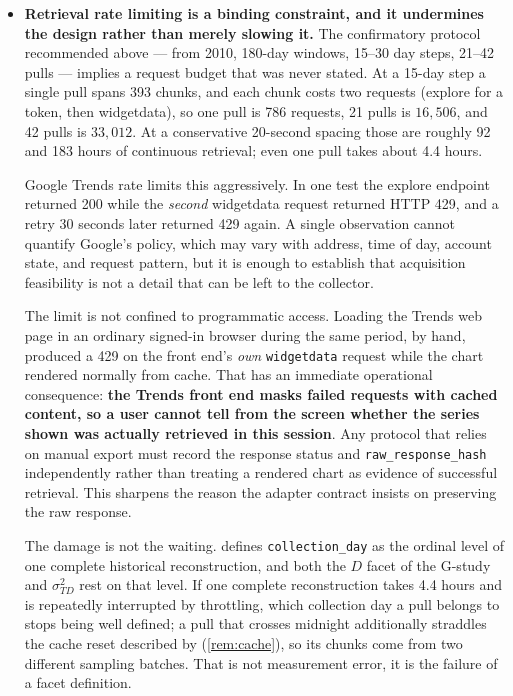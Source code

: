 \documentclass[12pt,a4paper,oneside]{article}
\begin{document}
\begin{itemize}
scraper, because endpoints, rate limits, authentication, and terms of service
change. Collectors need only emit the documented long-format schema.
\item \textbf{Retrieval rate limiting is a binding constraint, and it undermines
the design rather than merely slowing it.} The confirmatory protocol recommended
above --- from 2010, 180-day windows, 15--30 day steps, 21--42 pulls --- implies a
request budget that was never stated. At a 15-day step a single pull spans 393
chunks, and each chunk costs two requests (explore for a token, then
widgetdata), so one pull is 786 requests, 21 pulls is $16{,}506$, and 42 pulls is
$33{,}012$. At a conservative 20-second spacing those are roughly 92 and 183
hours of continuous retrieval; even one pull takes about 4.4 hours.

Google Trends rate limits this aggressively. In one test the explore endpoint
returned 200 while the \emph{second} widgetdata request returned HTTP 429, and a
retry 30 seconds later returned 429 again. A single observation cannot quantify
Google's policy, which may vary with address, time of day, account state, and
request pattern, but it is enough to establish that acquisition feasibility is
not a detail that can be left to the collector.

The limit is not confined to programmatic access. Loading the Trends web page in
an ordinary signed-in browser during the same period, by hand, produced a 429 on
the front end's \emph{own} \texttt{widgetdata} request while the chart rendered
normally from cache. That has an immediate operational consequence:
\textbf{the Trends front end masks failed requests with cached content, so a user
cannot tell from the screen whether the series shown was actually retrieved in
this session}. Any protocol that relies on manual export must record the response
status and \texttt{raw\_response\_hash} independently rather than treating a
rendered chart as evidence of successful retrieval. This sharpens the reason the
adapter contract insists on preserving the raw response.

The damage is not the waiting.  defines \texttt{collection\_day}
as the ordinal level of one complete historical reconstruction, and both the $D$
facet of the G-study and $\sigma^2_{TD}$ rest on that level. If one complete
reconstruction takes 4.4 hours and is repeatedly interrupted by throttling, which
collection day a pull belongs to stops being well defined; a pull that crosses
midnight additionally straddles the cache reset described by
\citet{Djorno2026} (\cref{rem:cache}), so its chunks come from two different
sampling batches. That is not measurement error, it is the failure of a facet
definition.


\end{itemize}
\end{document}
